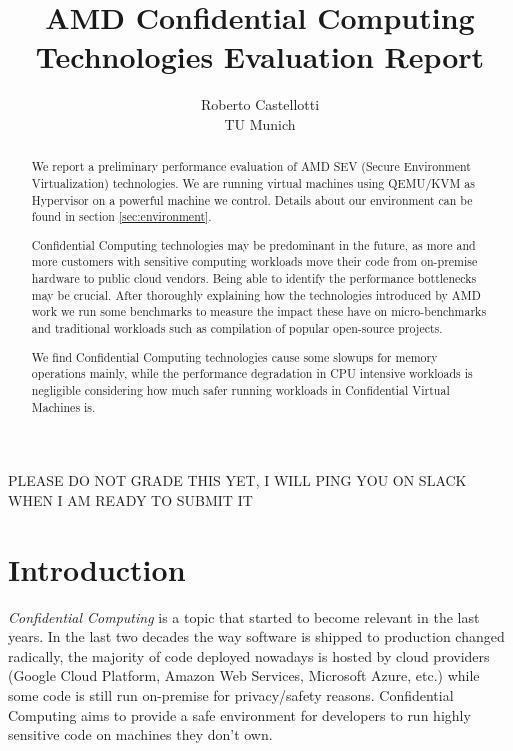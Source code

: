 \documentclass[twocolumn]{article}
\begin{document}
\date{}
\title{\Large \bf AMD Confidential Computing Technologies Evaluation Report}
\author{{\rm Roberto Castellotti}\\TU Munich}
\maketitle

PLEASE DO NOT GRADE THIS YET, I WILL PING YOU ON SLACK WHEN I AM READY TO SUBMIT IT
\begin{abstract}
We report a preliminary performance evaluation of AMD SEV (Secure Environment Virtualization) technologies.
We are running virtual machines using QEMU/KVM as Hypervisor on a powerful machine we control.
Details about our environment can be found in section \ref{sec:environment}.

Confidential Computing technologies may be predominant in the future, as more and more customers with sensitive computing workloads move their code from on-premise hardware to public cloud vendors. Being able to identify the performance bottlenecks may be crucial. After thoroughly explaining how the technologies introduced by AMD work we run some benchmarks to measure the impact these have on micro-benchmarks and traditional workloads such as compilation of popular open-source projects.

We find Confidential Computing technologies cause some slowups for memory operations mainly, while the performance degradation in CPU intensive workloads is negligible considering how much safer running workloads in Confidential Virtual Machines is.
\end{abstract}

\section{Introduction}

\textit{Confidential Computing} is a topic that started to become relevant in the last years. In the last two decades the way software is shipped to production changed radically, the majority of code deployed nowadays is hosted by cloud providers (Google Cloud Platform, Amazon Web Services, Microsoft Azure, etc.) while some code is still run on-premise for privacy/safety reasons. Confidential Computing aims to provide a safe environment for developers to run highly sensitive code on machines they don't own. 
\end{document}
